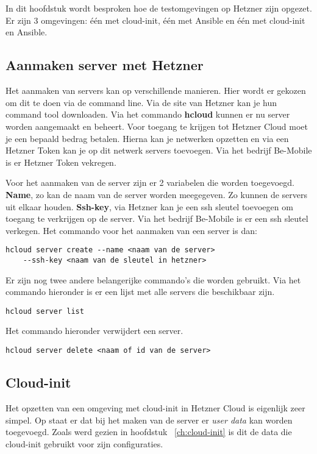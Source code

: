 \chapter{}
\label{ch:testhetzner}
In dit hoofdstuk wordt besproken hoe de testomgevingen op Hetzner zijn opgezet. Er zijn 3 omgevingen: één met cloud-init, één met Ansible en één met cloud-init en Ansible.

\section{Aanmaken server met Hetzner}
Het aanmaken van servers kan op verschillende manieren. Hier wordt er gekozen om dit te doen via de command line. Via de site van Hetzner kan je hun command tool downloaden. Via het commando \textbf{hcloud} kunnen er nu server worden aangemaakt en beheert. Voor toegang te krijgen tot Hetzner Cloud moet je een bepaald bedrag betalen. Hierna kan je netwerken opzetten en via een Hetzner Token kan je op dit netwerk servers toevoegen. Via het bedrijf Be-Mobile is er Hetzner Token vekregen.

Voor het aanmaken van de server zijn er 2 variabelen die worden toegevoegd. \textbf{Name}, zo kan de naam van de server worden meegegeven. Zo kunnen de servers uit elkaar houden. \textbf{Ssh-key}, via Hetzner kan je een ssh sleutel toevoegen om toegang te verkrijgen op de server. Via het bedrijf Be-Mobile is er een ssh sleutel verkegen. Het commando  voor het aanmaken van een server is dan:
\begin{lstlisting}[basicstyle=\small]
hcloud server create --name <naam van de server> 
    --ssh-key <naam van de sleutel in hetzner>
\end{lstlisting}
\newpage
Er zijn nog twee andere belangerijke commando's die worden gebruikt. Via het commando hieronder is er een lijst met alle servers die beschikbaar zijn.
\begin{lstlisting}[basicstyle=\small]
hcloud server list
\end{lstlisting}
Het commando hieronder verwijdert een server.
\begin{lstlisting}[basicstyle=\small]
hcloud server delete <naam of id van de server>
\end{lstlisting}


\section{Cloud-init}
Het opzetten van een omgeving met cloud-init in Hetzner Cloud is eigenlijk zeer simpel. Op \autocite{hetznerWiki} staat er dat bij het maken van de server er \textit{user data} kan worden toegevoegd. Zoals werd gezien in hoofdstuk ~\ref{ch:cloud-init} is dit de data die cloud-init gebruikt voor zijn configuraties.

